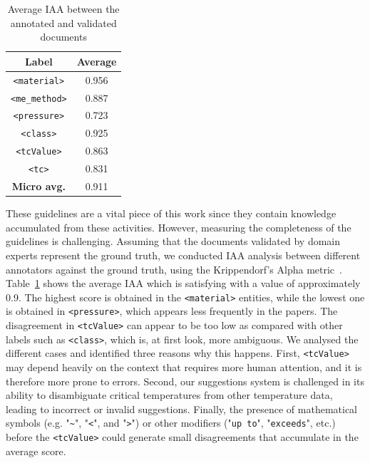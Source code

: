 \begin{table}[htbp]
    \centering
    \caption{Average IAA between the annotated and validated documents}
    \begin{tabular}{ c|c } 
    \toprule
        \textbf{Label} & \textbf{Average}\\
    \midrule
        \texttt{<material>}     &   0.956   \\
        \texttt{<me\_method>}   &	0.887   \\
        \texttt{<pressure>}     &	0.723   \\
        \texttt{<class>}        &	0.925   \\
        \texttt{<tcValue>}      &	0.863   \\
        \texttt{<tc>}           &	0.831   \\
    \midrule
        \textbf{Micro avg.}     &	0.911	\\
    \bottomrule
    \end{tabular}
    
    \label{table:average-iaa}
\end{table}

These guidelines are a vital piece of this work since they contain knowledge accumulated from these activities.
However, measuring the completeness of the guidelines is challenging. 
Assuming that the documents validated by domain experts represent the ground truth, we conducted IAA analysis between different annotators against the ground truth, using the Krippendorf's Alpha metric~\cite{Krippendorff2004ReliabilityIC}.
Table~\ref{table:average-iaa} shows the average IAA which is satisfying with a value of approximately 0.9. 
The highest score is obtained in the \texttt{<material>} entities, while the lowest one is obtained in \texttt{<pressure>}, which appears less frequently in the papers. 
The disagreement in \texttt{<tcValue>} can appear to be too low as compared with other labels such as \texttt{<class>}, which is, at first look, more ambiguous. 
We analysed the different cases and identified three reasons why this happens. 
First, \texttt{<tcValue>} may depend heavily on the context that requires more human attention, and it is therefore more prone to errors. 
Second, our suggestions system is challenged in its ability to disambiguate critical temperatures from other temperature data, leading to incorrect or invalid suggestions. 
Finally, the presence of mathematical symbols (e.g. "\texttt{\~}", "\texttt{<}", and "\texttt{>}") or other modifiers ("\texttt{up to}", "\texttt{exceeds}", etc.) before the \texttt{<tcValue>} could generate small disagreements that accumulate in the average score. 

